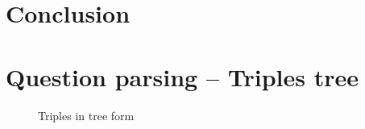 \documentclass[a4paper,10pt]{report}
\begin{document}
\chapter*{Conclusion}
    

\appendix



\nocite{*}

\chapter{Question parsing \--- Triples tree}

\begin{figure}[!ht]
\caption{Triples in tree form}
\label{triple_tree}

\end{figure}
\end{document}
